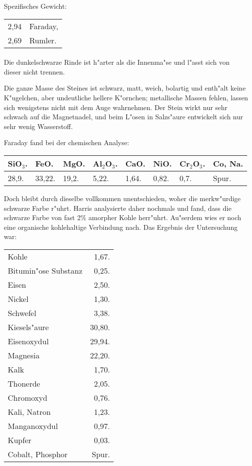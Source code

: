 \documentclass[a4paper, 11pt, oneside]{article}
\begin{document}
Spezifisches Gewicht:  
\begin{table}[!ht]
    \centering
    \begin{tabular}{l l}
        2,94 & Faraday,\\
        2,69 & Rumler.
    \end{tabular}
\end{table}
\paragraph{}
Die dunkelschwarze Rinde ist h"arter als die Innenma"se und l"asst sich von dieser nicht trennen.

Die ganze Masse des Steines ist schwarz, matt, weich, bolartig und enth"alt keine K"ugelchen, aber undeutliche hellere K"ornchen; metallische Massen fehlen, lassen sich wenigstens nicht mit dem Auge wahrnehmen. Der Stein wirkt nur sehr schwach auf die Magnetnadel, und beim L"osen in Salzs"aure entwickelt sich nur sehr wenig Wasserstoff.

Faraday fand bei der chemischen Analyse:
\begin{table}[H]
    \centering
    \begin{tabular}{l l l l l l l l}
        SiO$_{3}$. & FeO. & MgO. & Al$_{2}$O$_{3}$. & CaO. & NiO. & Cr$_{2}$O$_{3}$. & Co, Na. \\ \hline
        28,9. & 33,22. & 19,2. & 5,22. & 1,64. & 0,82. & 0,7. & Spur. \\
    \end{tabular}
\end{table}

Doch bleibt durch dieselbe vollkommen unentschieden, woher die merkw"urdige schwarze Farbe r"uhrt. Harris analysierte daher nochmals und fand, dass die schwarze Farbe von fast 2\% amorpher Kohle herr"uhrt. Au"serdem wies er noch eine organische kohlehaltige Verbindung nach. Das Ergebnis der Untersuchung war:
\begin{table}[!ht]
    \centering
    \begin{tabular}{l r}
        Kohle & 1,67. \\
        Bitumin"ose Substanz & 0,25. \\
        Eisen & 2,50. \\
        Nickel & 1,30. \\
        Schwefel & 3,38. \\
        Kiesels"aure & 30,80. \\
        Eisenoxydul & 29,94. \\
        Magnesia & 22,20. \\
        Kalk & 1,70. \\
        Thonerde & 2,05. \\
        Chromoxyd & 0,76. \\
        Kali, Natron & 1,23. \\
        Manganoxydul & 0,97. \\
        Kupfer & 0,03. \\
        Cobalt, Phosphor & Spur. \\
    \end{tabular}
\end{table}
\end{document}
